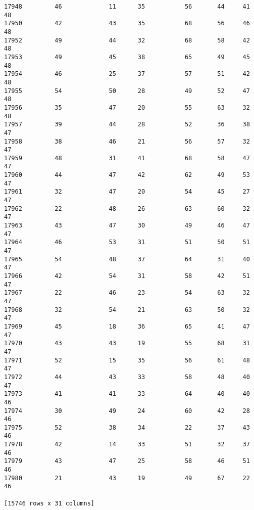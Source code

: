 \documentclass[11pt]{article}
\begin{document}
\begin{verbatim}
17948         46             11      35           56       44     41      48  
17950         42             43      35           68       56     46      48  
17952         49             44      32           68       58     42      48  
17953         49             45      38           65       49     45      48  
17954         46             25      37           57       51     42      48  
17955         54             50      28           49       52     47      48  
17956         35             47      20           55       63     32      48  
17957         39             44      28           52       36     38      47  
17958         38             46      21           56       57     32      47  
17959         48             31      41           68       58     47      47  
17960         44             47      42           62       49     53      47  
17961         32             47      20           54       45     27      47  
17962         22             48      26           63       60     32      47  
17963         43             47      30           49       46     47      47  
17964         46             53      31           51       50     51      47  
17965         54             48      37           64       31     40      47  
17966         42             54      31           58       42     51      47  
17967         22             46      23           54       63     32      47  
17968         32             54      21           63       50     32      47  
17969         45             18      36           65       41     47      47  
17970         43             43      19           55       68     31      47  
17971         52             15      35           56       61     48      47  
17972         44             43      33           58       48     40      47  
17973         41             41      33           64       40     40      46  
17974         30             49      24           60       42     28      46  
17975         52             38      34           22       37     43      46  
17978         42             14      33           51       32     37      46  
17979         43             47      25           58       46     51      46  
17980         21             43      19           49       67     22      46  

[15746 rows x 31 columns]
    \end{verbatim}

    

    
    
    
    
\end{document}

